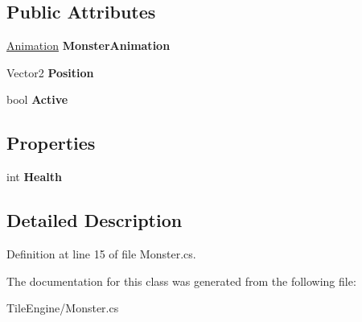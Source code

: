 \subsection*{Public Attributes}
\begin{DoxyCompactItemize}
\item 
\hypertarget{class_tile_engine_1_1_monster_a4a7445ca8fcaebf69c34678716110eeb}{\hyperlink{class_tile_engine_1_1_animation}{Animation} {\bfseries Monster\-Animation}}\label{class_tile_engine_1_1_monster_a4a7445ca8fcaebf69c34678716110eeb}

\item 
\hypertarget{class_tile_engine_1_1_monster_a793d2d9816fc7793bce1c106b0623db0}{Vector2 {\bfseries Position}}\label{class_tile_engine_1_1_monster_a793d2d9816fc7793bce1c106b0623db0}

\item 
\hypertarget{class_tile_engine_1_1_monster_a02284f88a72e281f261b544f744fdfab}{bool {\bfseries Active}}\label{class_tile_engine_1_1_monster_a02284f88a72e281f261b544f744fdfab}

\end{DoxyCompactItemize}
\subsection*{Properties}
\begin{DoxyCompactItemize}
\item 
\hypertarget{class_tile_engine_1_1_monster_aab1854412a7509be407e2487ae02eea5}{int {\bfseries Health}}\label{class_tile_engine_1_1_monster_aab1854412a7509be407e2487ae02eea5}

\end{DoxyCompactItemize}


\subsection{Detailed Description}


Definition at line 15 of file Monster.\-cs.



The documentation for this class was generated from the following file\-:\begin{DoxyCompactItemize}
\item 
Tile\-Engine/Monster.\-cs\end{DoxyCompactItemize}
